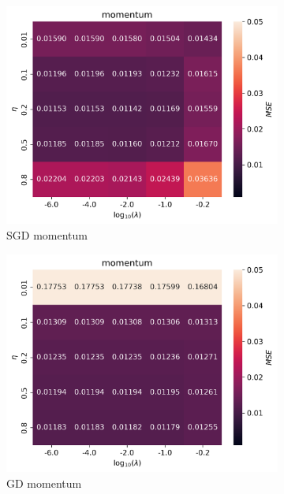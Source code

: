 \documentclass[11pt]{article}
\begin{document}
\begin{figure}[H]
\begin{subfigure}{.5\textwidth}
    \centering
    \includegraphics[width=\textwidth]{../figures/momentum_SGD_eta_lmb.png}
    \caption{SGD momentum}
    \label{fig:}
  \end{subfigure}
  \begin{subfigure}{.5\textwidth}
    \centering
    \includegraphics[width=\textwidth]{../figures/momentum_GD_eta_lmb.png}
    \caption{GD momentum}
    \label{fig:}
  \end{subfigure}
  \begin{subfigure}{.5\textwidth}
    \centering

\end{subfigure}
\end{figure}
\end{document}
